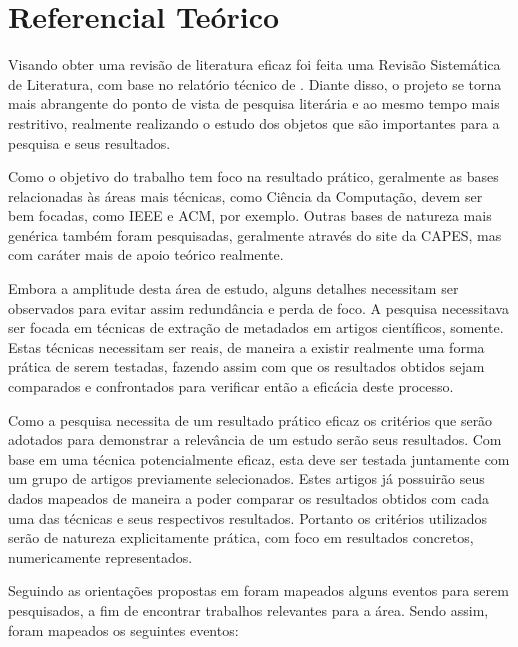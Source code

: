 
\chapter{Referencial Teórico}


Visando obter uma revisão de literatura eficaz foi feita uma Revisão Sistemática de Literatura, com base no relatório técnico de \cite{Kitchenham}. Diante disso, o projeto se torna mais abrangente do ponto de vista de pesquisa literária e ao mesmo tempo mais restritivo, realmente realizando o estudo dos objetos que são importantes para a pesquisa e seus resultados.


Como o objetivo do trabalho tem foco na resultado prático, geralmente as bases relacionadas às áreas mais técnicas, como Ciência da Computação, devem ser bem focadas, como IEEE e ACM, por exemplo. Outras bases de natureza mais genérica também foram pesquisadas, geralmente através do site da CAPES, mas com caráter mais de apoio teórico realmente.

Embora a amplitude desta área de estudo, alguns detalhes necessitam ser observados para evitar assim redundância e perda de foco. A pesquisa necessitava ser focada em técnicas de extração de metadados em artigos científicos, somente. Estas técnicas necessitam ser reais, de maneira a existir realmente uma forma prática de serem testadas, fazendo assim com que os resultados obtidos sejam comparados e confrontados para verificar então a eficácia deste processo.

Como a pesquisa necessita de um resultado prático eficaz os critérios que serão adotados para demonstrar a relevância de um estudo serão seus resultados. Com base em uma técnica potencialmente eficaz, esta deve ser testada juntamente com um grupo de artigos previamente selecionados. Estes artigos já possuirão seus dados mapeados de maneira a poder comparar os resultados obtidos com cada uma das técnicas e seus respectivos resultados. Portanto os critérios utilizados serão de natureza explicitamente prática, com foco em resultados concretos, numericamente representados.


Seguindo as orientações propostas em \cite{Kitchenham} foram mapeados alguns eventos para serem pesquisados, a fim de encontrar trabalhos relevantes para a área. Sendo assim, foram mapeados os seguintes eventos:

